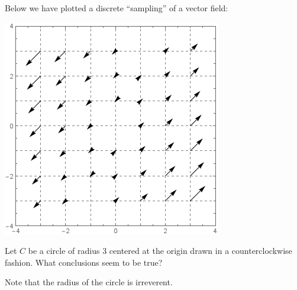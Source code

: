 \documentclass{ximera}
\begin{document}
\begin{exercise}
  Below we have plotted a discrete ``sampling'' of a vector field:
  \begin{image}
    \includegraphics{field3.png}
  \end{image}
  Let $C$ be a circle of radius $3$ centered at the origin drawn in a
  counterclockwise fashion.  What conclusions seem to be true?
  \begin{selectAll}
  \end{selectAll}
  \begin{hint}
    Note that the radius of the circle is irreverent. 
  \end{hint}
\end{exercise}
\end{document}
